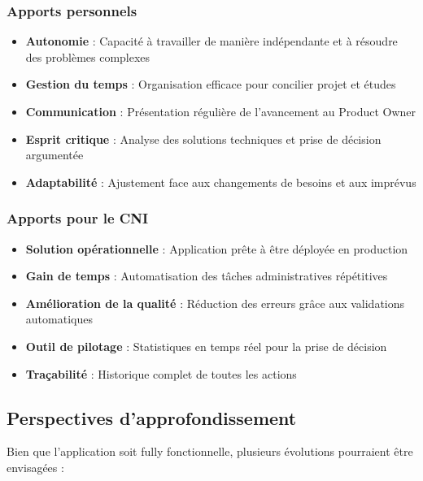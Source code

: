 \documentclass[12pt,a4paper]{report}
\begin{document}
\subsubsection{Apports personnels}

\begin{itemize}[leftmargin=1cm]
    \item \textbf{Autonomie} : Capacité à travailler de manière indépendante et à résoudre des problèmes complexes
    \item \textbf{Gestion du temps} : Organisation efficace pour concilier projet et études
    \item \textbf{Communication} : Présentation régulière de l'avancement au Product Owner
    \item \textbf{Esprit critique} : Analyse des solutions techniques et prise de décision argumentée
    \item \textbf{Adaptabilité} : Ajustement face aux changements de besoins et aux imprévus
\end{itemize}

\subsubsection{Apports pour le CNI}

\begin{itemize}[leftmargin=1cm]
    \item \textbf{Solution opérationnelle} : Application prête à être déployée en production
    \item \textbf{Gain de temps} : Automatisation des tâches administratives répétitives
    \item \textbf{Amélioration de la qualité} : Réduction des erreurs grâce aux validations automatiques
    \item \textbf{Outil de pilotage} : Statistiques en temps réel pour la prise de décision
    \item \textbf{Traçabilité} : Historique complet de toutes les actions
\end{itemize}

\subsection*{Perspectives d'approfondissement}

Bien que l'application soit fully fonctionnelle, plusieurs évolutions pourraient être envisagées :
\end{document}
